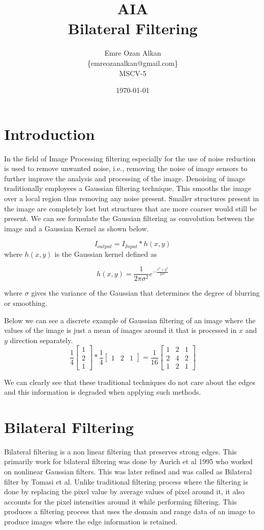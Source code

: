 \documentclass[12pt]{article}
\title{AIA\\
		Bilateral Filtering}
\author{Emre Ozan Alkan\\
		\{emreozanalkan@gmail.com\}\\
		MSCV-5}
\date{\today}
\begin{document}
\maketitle

\section{Introduction}


In the field of Image Processing filtering  especially for the use of noise reduction is used to remove unwanted noise, i.e., removing the noise of image sensors to further improve the analysis and processing of the image. Denoising of image traditionally employees a Gaussian filtering technique. This smooths the image over a local region thus removing any noise present. Smaller structures present in the image are completely lost but structures that are more coarser would still be present. We can see formulate the Gaussian filtering as convolution between the image and a Gaussian Kernel as shown below.

$$I_{output} = I_{Input}* h(x,y)$$
where $h(x,y)$ is the Gaussian kernel defined as  

$$h(x,y) = \frac{1}{{2\pi}\sigma^2}e^{-\frac{x^2+y^2}{2\sigma^2}}$$

where $\sigma$ gives the variance of the Gaussian that determines the degree of blurring or smoothing.

Below we can see a discrete example of Gaussian filtering of an image where the values of the image is just a mean of images around it that is processed in $x$ and $y$ direction separately.
$$ \frac{1}{4}
\begin{bmatrix} 
    1 \\ 2 \\ 1  
\end{bmatrix} 
*
\frac{1}{4}
\begin{bmatrix} 
    1 & 2 & 1
\end{bmatrix} = \frac{1}{16}
\begin{bmatrix} 
    1 & 2 & 1 \\ 
    2 & 4 & 2 \\
    1 & 2 & 1
\end{bmatrix} $$

We can clearly see that these traditional techniques do not care about the edges and this information is degraded when applying such methods.
\section{Bilateral Filtering}
Bilateral filtering is a non linear filtering that preserves strong edges. This primarily work for bilateral filtering was done by Aurich et al 1995 who worked on nonlinear Gaussian filters. This was later refined and was called as Bilateral filter by Tomasi et al. Unlike traditional filtering process where the filtering is done by replacing the pixel value by average values of pixel around it, it also 	accounts for the pixel intensities around it while performing filtering. This produces a filtering process that uses the domain and range data of an image to produce images where the edge information is retained.
\end{document}

